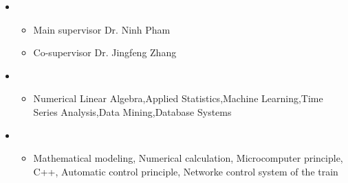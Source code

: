   \begin{itemize}[leftmargin=*]

          \item
      {\small
      \begin{itemize}
        \item{Main supervisor Dr. Ninh Pham}
        \item{Co-supervisor Dr. Jingfeng Zhang}
      \end{itemize}
      }
       
  
      \item
      {\small
      \begin{itemize}
        \item{Numerical Linear Algebra,Applied Statistics,Machine Learning,Time Series Analysis,Data Mining,Database Systems}
      \end{itemize}
      }
      
        \item
      {\small
      \begin{itemize}
        \item{Mathematical modeling, Numerical calculation, Microcomputer principle, C++, Automatic control principle, Networke control system of the train}
      \end{itemize}
      }
      
  \end{itemize} 